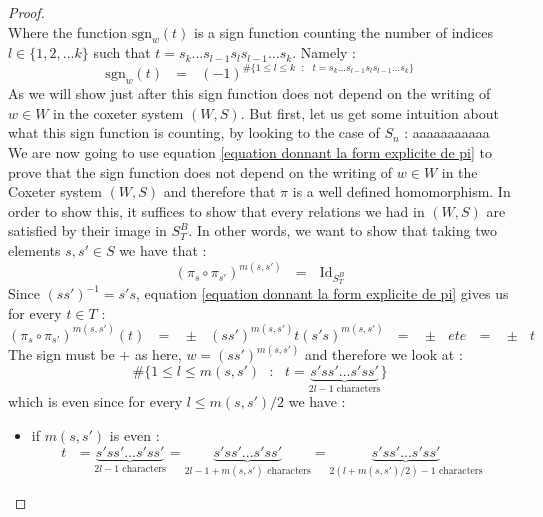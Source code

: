 \documentclass[envcountsame,envcountchap]{svmono}
\newcommand{\qq}{\text{ }}
\begin{document}
\begin{proof}
\begin{equation}
		\end{equation}
		Where the function $\mbox{sgn}_w(t)$ is a sign function counting the number of indices $l\in \{1,2,...k\}$ such that $t=s_k...s_{l-1}s_l s_{l-1}...s_k$. Namely :
		\begin{equation}
		 \mbox{sgn}_w(t)\qq=\qq (-1)^{\# \{1\leq l\leq k\qq :\qq t=s_k...s_{l-1}s_l s_{l-1}...s_k\}}
		\end{equation}
		As we will show just after this sign function does not depend on the writing of $w\in W$ in the coxeter system $(W,S)$. But first, let us get some intuition about what this sign function is counting, by looking to the case of $S_n$ : aaaaaaaaaaa\\

		We are now going to use equation \ref{equation donnant la form explicite de pi} to prove that the sign function does not depend on the writing of $w\in W$ in the Coxeter system $(W,S)$ and  therefore that $\pi$ is a well defined homomorphism. In order to show this, it suffices to show that every relations we had in $(W,S)$ are satisfied by their image in $S^B_T$. In other words, we want to show that taking two elements $s,s'\in S$ we have that :
		\begin{equation}\label{equation provant que les relations sont preserves par pi}
		(\pi_s\circ \pi_{s'})^{m(s,s')}\qq=\qq \mbox{Id}_{S^B_T}
		\end{equation}
		Since $(ss')^{-1}=s's$, equation \ref{equation donnant la form explicite de pi} gives us for every $t\in T$ :
		\begin{equation}
		(\pi_s\circ \pi_{s'})^{m(s,s')}(t)\qq=\qq \pm\qq (ss')^{m(s,s')}t(s's)^{m(s,s')}\qq=\qq \pm \qq et e\qq=\qq\pm \qq  t
		\end{equation}
		The sign must be $+$ as here, $w=(ss')^{m(s,s')}$ and therefore we look at :
		\begin{equation}
		{\# \{1\leq l\leq m(s,s') \qq :\qq t=\underset{2l-1 \mbox{ characters}}{\underbrace{s'ss'...s'ss'}}\}}
		\end{equation}
		which is even since for every $l\leq m(s,s')/2$ we have :
		\begin{itemize}
			\item if $ m(s,s')$ is even :
			\begin{equation}
			t\qq= \underset{2l-1 \mbox{ characters}}{\underbrace{s'ss'...s'ss'}}=\underset{2l-1 + m(s,s') \mbox{ characters}}{\underbrace{s'ss'...s'ss'}}= \underset{2(l+m(s,s')/2)-1 \mbox{ characters}}{\underbrace{s'ss'...s'ss'}}
			\end{equation}

\end{itemize}
\end{proof}
\end{document}
